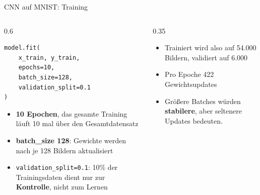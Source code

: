 \begin{frame}[fragile]{CNN auf MNIST: Training}
\begin{columns}
\begin{column}{0.6\linewidth}
\begin{verbatim}
model.fit(
    x_train, y_train,
    epochs=10,
    batch_size=128,
    validation_split=0.1
)

\end{verbatim}
\begin{itemize}
  \item \textbf{10 Epochen}, das gesamte Training läuft 10 mal über den Gesamtdatensatz
  \item \textbf{batch\_size 128}: Gewichte werden nach je 128 Bildern aktualisiert
  \item \texttt{validation\_split=0.1}: 10\% der Trainingsdaten dient nur zur \textbf{Kontrolle}, nicht zum Lernen
\end{itemize}
\end{column}
\begin{column}{0.35\linewidth}
\begin{itemize}
  \item Trainiert wird also auf 54.000 Bildern, validiert auf 6.000
  \item Pro Epoche 422 Gewichtsupdates
  \item Größere Batches würden \textbf{stabilere}, aber seltenere Updates bedeuten. 
\end{itemize}
\end{column}
\end{columns}
\end{frame}


